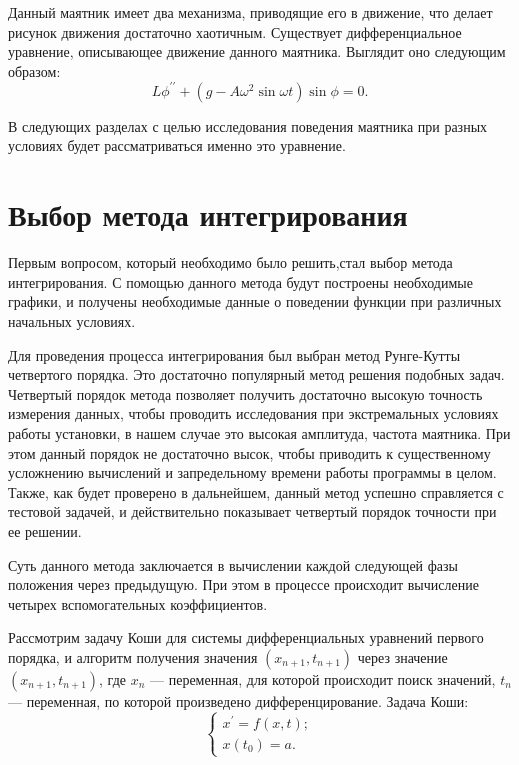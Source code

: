 \documentclass[a4paper,12pt]{article}
\begin{document}
	Данный маятник имеет два механизма, приводящие его в движение, что делает
	рисунок движения достаточно хаотичным. Существует дифференциальное 
	уравнение, описывающее движение данного маятника. Выглядит оно следующим
	образом:
	\begin{equation}L\phi^{\prime\prime} + (g - A\omega^2 \sin\omega t) \sin\phi = 0.\end{equation}

	В следующих разделах с целью исследования поведения маятника при разных
	условиях будет рассматриваться именно это уравнение.

	\newpage
	\section{Выбор метода интегрирования}
	Первым вопросом, который необходимо было решить,стал выбор метода 
	интегрирования. С помощью данного метода будут построены необходимые 
	графики, и получены необходимые данные о поведении функции при различных
	начальных условиях.

	Для проведения процесса интегрирования был выбран метод Рунге-Кутты 
	четвертого порядка. Это достаточно популярный метод решения подобных 
	задач. Четвертый порядок метода позволяет получить достаточно высокую
	точность измерения данных, чтобы проводить исследования при экстремальных 
	условиях работы установки, в нашем случае это высокая амплитуда, частота
	маятника. При этом данный порядок не достаточно высок, чтобы приводить 
	к существенному усложнению вычислений и запредельному времени работы 
	программы в целом. Также, как будет проверено в дальнейшем, данный метод
	успешно справляется с тестовой задачей, и действительно показывает 
	четвертый порядок точности при ее решении.

	Суть данного метода заключается в вычислении каждой следующей фазы 
	положения через предыдущую. При этом в процессе происходит вычисление
	четырех вспомогательных коэффициентов.

	Рассмотрим задачу Коши для системы дифференциальных уравнений первого 
	порядка, и алгоритм получения значения $(x_{n+1}, t_{n+1})$ через 
	значение $(x_{n+1}, t_{n+1})$, где $x_n$ --- переменная, для которой
	происходит поиск значений, $t_n$ --- переменная, по которой произведено 
	дифференцирование. Задача Коши:
	\begin{equation}
		\begin{cases}
			x^\prime = f(x, t); \\
			x(t_0) = a.
		\end{cases}
	\end{equation}
\end{document}
